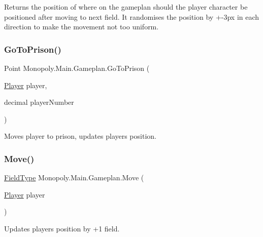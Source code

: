 Returns the position of where on the gameplan should the player character be positioned after moving to next field. It randomises the position by +-\/3px in each direction to make the movement not too uniform. \mbox{\label{class_monopoly_1_1_main_1_1_gameplan_ae3890109e75eee2c5e0278d22c085351}} 
\subsubsection{\texorpdfstring{Go\+To\+Prison()}{GoToPrison()}}
{\footnotesize\ttfamily Point Monopoly.\+Main.\+Gameplan.\+Go\+To\+Prison (\begin{DoxyParamCaption}\item[{\mbox{\hyperlink{class_monopoly_1_1_players_1_1_player}{Player}}}]{player,  }\item[{decimal}]{player\+Number }\end{DoxyParamCaption})\hspace{0.3cm}{\ttfamily [inline]}}

Moves player to prison, updates player\textquotesingle{}s position. \mbox{\label{class_monopoly_1_1_main_1_1_gameplan_a13be4352f77013b7921655145b59324b}} 
\subsubsection{\texorpdfstring{Move()}{Move()}}
{\footnotesize\ttfamily \mbox{\hyperlink{class_monopoly_1_1_main_1_1_gameplan_a460f9e6d576d65d9ad9fe2b291ee2344}{Field\+Type}} Monopoly.\+Main.\+Gameplan.\+Move (\begin{DoxyParamCaption}\item[{\mbox{\hyperlink{class_monopoly_1_1_players_1_1_player}{Player}}}]{player }\end{DoxyParamCaption})\hspace{0.3cm}{\ttfamily [inline]}}

Updates player\textquotesingle{}s position by +1 field. \mbox{\label{class_monopoly_1_1_main_1_1_gameplan_ac2b68af09cce82875419779d1cdc9523}} 

